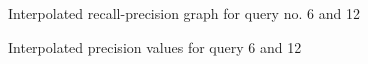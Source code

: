 \documentclass[letterpaper,11pt]{article}
\begin{document}
\begin{figure}[H]
	\centering
	\caption{Interpolated recall-precision graph for query no. 6 and 12}
	\label{fig:84_interpolated}
\end{figure}

\begin{figure}[H]
	\centering
	\caption{Interpolated precision values for query 6 and 12}
	\label{fig:8_4_interpolated_table}
\end{figure}
\end{document}
